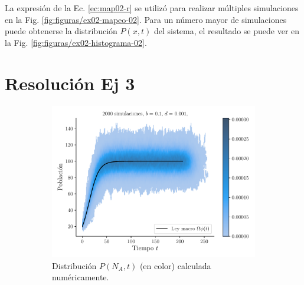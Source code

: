 \documentclass[twocolumn,aps,prl]{revtex4-1}
\begin{document}
La expresión de la Ec. \ref{ec:map02-r} se utilizó para realizar múltiples simulaciones en la Fig. \ref{fig:figuras/ex02-mapeo-02}. Para un número mayor de simulaciones puede obtenerse la distribución $P(x,t)$ del sistema, el resultado se puede ver en la Fig. \ref{fig:figuras/ex02-histograma-02}.

\section{Resolución Ej 3}


\begin{figure}[ht!]
  \centering
  \begin{subfigure}[b]{0.49\linewidth}
      \centering
      \includegraphics[width = 0.999\textwidth]{figuras/ex03-a-SinCota.pdf}
      \caption{Distribución $P(N_A,t)$ (en color) calculada numéricamente.}
      \label{fig:figuras/ex03-a-SinCota}
  \end{subfigure}\quad
  \begin{subfigure}[b]{0.49\linewidth}
      \centering

\end{subfigure}
\end{figure}
\end{document}
